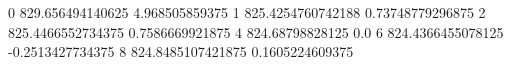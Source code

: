 0 829.656494140625 4.968505859375
1 825.4254760742188 0.73748779296875
2 825.4466552734375 0.7586669921875
4 824.68798828125 0.0
6 824.4366455078125 -0.2513427734375
8 824.8485107421875 0.1605224609375

